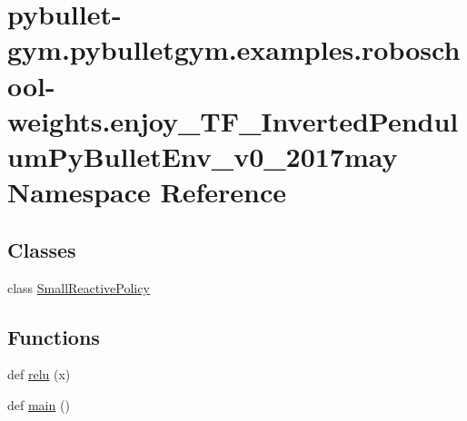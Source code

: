 \hypertarget{namespacepybullet-gym_1_1pybulletgym_1_1examples_1_1roboschool-weights_1_1enjoy___t_f___inverted9d6b81a55deda3e52174841fe13ce955}{}\section{pybullet-\/gym.pybulletgym.\+examples.\+roboschool-\/weights.enjoy\+\_\+\+T\+F\+\_\+\+Inverted\+Pendulum\+Py\+Bullet\+Env\+\_\+v0\+\_\+2017may Namespace Reference}
\label{namespacepybullet-gym_1_1pybulletgym_1_1examples_1_1roboschool-weights_1_1enjoy___t_f___inverted9d6b81a55deda3e52174841fe13ce955}
\subsection*{Classes}
\begin{DoxyCompactItemize}
\item 
class \hyperlink{classpybullet-gym_1_1pybulletgym_1_1examples_1_1roboschool-weights_1_1enjoy___t_f___inverted_pene95dc0b26e1399bbb755e282675321a9}{Small\+Reactive\+Policy}
\end{DoxyCompactItemize}
\subsection*{Functions}
\begin{DoxyCompactItemize}
\item 
def \hyperlink{namespacepybullet-gym_1_1pybulletgym_1_1examples_1_1roboschool-weights_1_1enjoy___t_f___inverted9d6b81a55deda3e52174841fe13ce955_ac5375a9cd3b7921aae38f40b73c9ecca}{relu} (x)
\item 
def \hyperlink{namespacepybullet-gym_1_1pybulletgym_1_1examples_1_1roboschool-weights_1_1enjoy___t_f___inverted9d6b81a55deda3e52174841fe13ce955_aa0ad840ed339bc3b9bce84a00d6abf9c}{main} ()
\end{DoxyCompactItemize}
